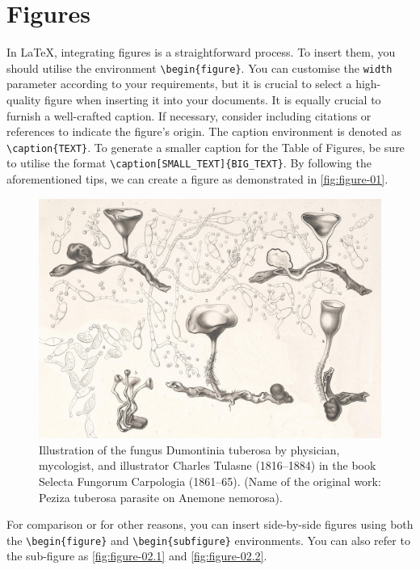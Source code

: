 \section{Figures}
In \LaTeX, integrating figures is a straightforward process. To insert them, you should utilise the environment \verb|\begin{figure}|. You can customise the \verb|width| parameter according to your requirements, but it is crucial to select a high-quality figure when inserting it into your documents. It is equally crucial to furnish a well-crafted caption. If necessary, consider including citations or references to indicate the figure's origin. The caption environment is denoted as \verb|\caption{TEXT}|. To generate a smaller caption for the Table of Figures, be sure to utilise the format \verb|\caption[SMALL_TEXT]{BIG_TEXT}|. By following the aforementioned tips, we can create a figure as demonstrated in \autoref{fig:figure-01}.

\begin{figure}[!htpb]
    \centering
    \includegraphics[width=\linewidth]{Figures/PezizaTuberosa.jpg}
    \caption[Illustration of the fungus Dumontinia tuberosa.]{Illustration of the fungus Dumontinia tuberosa by physician, mycologist, and illustrator Charles Tulasne (1816–1884) in the book Selecta Fungorum Carpologia (1861–65). (Name of the original work: Peziza tuberosa parasite on Anemone nemorosa).}
    \label{fig:figure-01}
\end{figure}

For comparison or for other reasons, you can insert side-by-side figures using both the \verb|\begin{figure}| and \verb|\begin{subfigure}| environments. You can also refer to the sub-figure as \autoref{fig:figure-02.1} and \autoref{fig:figure-02.2}.

